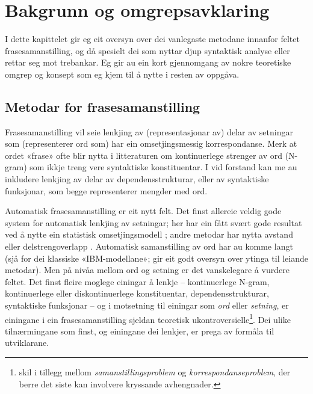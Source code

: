 \documentclass[11pt,a4paper,oneside,draft]{report}
\begin{document}
\chapter{Bakgrunn og omgrepsavklaring}
\label{sec-2}

  \label{SEC:bakgrunn}

  
I dette kapittelet gir eg eit oversyn over dei vanlegaste metodane
innanfor feltet frasesamanstilling, og då spesielt dei som nyttar djup
syntaktisk analyse eller rettar seg mot trebankar. Eg gir au ein kort
gjennomgang av nokre teoretiske omgrep og konsept som eg kjem til å
nytte i resten av oppgåva.

\section{Metodar for frasesamanstilling}
\label{sec-2.1}

Frasesamanstilling vil seie lenkjing av (representasjonar av) delar av
setningar som (representerer ord som) har ein omsetjingsmessig
korrespondanse. Merk at ordet «frase» ofte blir nytta i litteraturen
om kontinuerlege strenger av ord (N-gram) som ikkje treng vere
syntaktiske konstituentar. I vid forstand kan me au inkludere lenkjing
av delar av dependensstrukturar, eller av syntaktiske funksjonar, som
begge representerer mengder med ord.

Automatisk frasesamanstilling er eit nytt felt.  Det finst allereie
veldig gode system for automatisk lenkjing av setningar; her har ein
fått svært gode resultat ved å nytte ein statistisk omsetjingsmodell
\citep{chen1993asb}; andre metodar har nytta avstand eller
delstrengoverlapp
\citep[s.~467--484~gir~eit~oversyn]{manning99foundations}.  Automatisk
samanstilling av ord har au komme langt (sjå \citet{brown1993msm} for
dei klassiske «IBM-modellane»; \citet{och2003scv} gir eit godt oversyn
over ytinga til leiande metodar).  Men på nivåa mellom ord og setning
er det vanskelegare å vurdere feltet.  Det finst fleire moglege
einingar å lenkje -- kontinuerlege N-gram, kontinuerlege eller
diskontinuerlege konstituentar, dependensstrukturar, syntaktiske
funksjonar -- og i motsetning til einingar som \emph{ord} eller \emph{setning},
er einingane i ein frasesamanstilling sjeldan teoretisk
ukontroversielle\footnote{\citet[s.~470]{manning99foundations} skil i tillegg mellom
        \emph{samanstillingsproblem} og \emph{korrespondanseproblem}, der berre
        det siste kan involvere kryssande avhengnader. }.  Dei ulike tilnærmingane som finst, og
einingane dei lenkjer, er prega av formåla til utviklarane.
\end{document}
